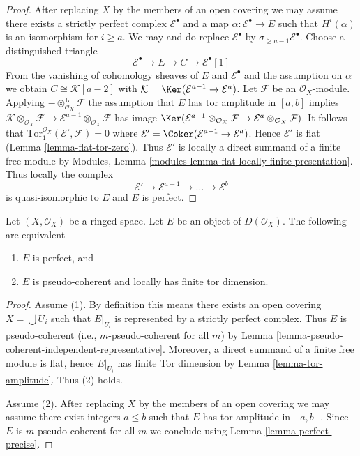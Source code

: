 \begin{proof}
After replacing $X$ by the members of an open covering we may assume there
exists a strictly perfect complex $\mathcal{E}^\bullet$ and a map
$\alpha : \mathcal{E}^\bullet \to E$ such that $H^i(\alpha)$ is an isomorphism
for $i \geq a$. We may and do replace $\mathcal{E}^\bullet$ by
$\sigma_{\geq a - 1}\mathcal{E}^\bullet$. Choose a distinguished triangle
$$
\mathcal{E}^\bullet \to E \to C \to \mathcal{E}^\bullet[1]
$$
From the vanishing of cohomology sheaves of $E$ and $\mathcal{E}^\bullet$
and the assumption on $\alpha$ we obtain $C \cong \mathcal{K}[a - 2]$ with
$\mathcal{K} = \Ker(\mathcal{E}^{a - 1} \to \mathcal{E}^a)$.
Let $\mathcal{F}$ be an $\mathcal{O}_X$-module.
Applying $- \otimes_{\mathcal{O}_X}^\mathbf{L} \mathcal{F}$
the assumption that $E$ has tor amplitude in $[a, b]$
implies $\mathcal{K} \otimes_{\mathcal{O}_X} \mathcal{F} \to
\mathcal{E}^{a - 1} \otimes_{\mathcal{O}_X} \mathcal{F}$ has image
$\Ker(\mathcal{E}^{a - 1} \otimes_{\mathcal{O}_X} \mathcal{F}
\to \mathcal{E}^a \otimes_{\mathcal{O}_X} \mathcal{F})$.
It follows that $\text{Tor}_1^{\mathcal{O}_X}(\mathcal{E}', \mathcal{F}) = 0$
where $\mathcal{E}' = \Coker(\mathcal{E}^{a - 1} \to \mathcal{E}^a)$.
Hence $\mathcal{E}'$ is flat (Lemma \ref{lemma-flat-tor-zero}).
Thus $\mathcal{E}'$ is locally a direct summand of a finite free module by
Modules, Lemma \ref{modules-lemma-flat-locally-finite-presentation}.
Thus locally the complex
$$
\mathcal{E}' \to \mathcal{E}^{a - 1} \to \ldots \to \mathcal{E}^b
$$
is quasi-isomorphic to $E$ and $E$ is perfect.
\end{proof}

\begin{lemma}
\label{lemma-perfect}
Let $(X, \mathcal{O}_X)$ be a ringed space.
Let $E$ be an object of $D(\mathcal{O}_X)$.
The following are equivalent
\begin{enumerate}
\item $E$ is perfect, and
\item $E$ is pseudo-coherent and locally has finite tor dimension.
\end{enumerate}
\end{lemma}

\begin{proof}
Assume (1). By definition this means there exists an open covering
$X = \bigcup U_i$ such that $E|_{U_i}$ is represented by a
strictly perfect complex. Thus $E$ is pseudo-coherent (i.e.,
$m$-pseudo-coherent for all $m$) by
Lemma \ref{lemma-pseudo-coherent-independent-representative}.
Moreover, a direct summand of a finite free module is flat, hence
$E|_{U_i}$ has finite Tor dimension by
Lemma \ref{lemma-tor-amplitude}. Thus (2) holds.

\medskip\noindent
Assume (2). After replacing $X$ by the members of an open covering
we may assume there exist integers $a \leq b$ such that $E$
has tor amplitude in $[a, b]$. Since $E$ is $m$-pseudo-coherent
for all $m$ we conclude using Lemma \ref{lemma-perfect-precise}.
\end{proof}

